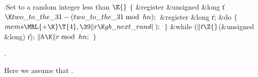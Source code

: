 \B{}:Set  to a random integer less than \X${}\E{}$\6
${}\{{}$\1\6
\&{register} \&{unsigned} \&{long} \|t${}\K\\{two\_to\_the\_31}-(\\{two\_to%
\_the\_31}\Xmod\\{hn});{}$\6
\&{register} \&{long} \|r;\7
\&{do}\5
${}\{{}$\1\6
${}\\{mems}\MRL{+{\K}}\T{4},\39\|r\K\\{gb\_next\_rand}(\,);{}$\6
\4${}\}{}$\5
\2\5
\&{while} ${}(\|t\Z{}$(\&{unsigned} \&{long}) \|r);\6
${}\|h\K\|r\Xmod\\{hn};{}$\6
\4${}\}{}$\2\par
{}.\fi

Here we assume that .


